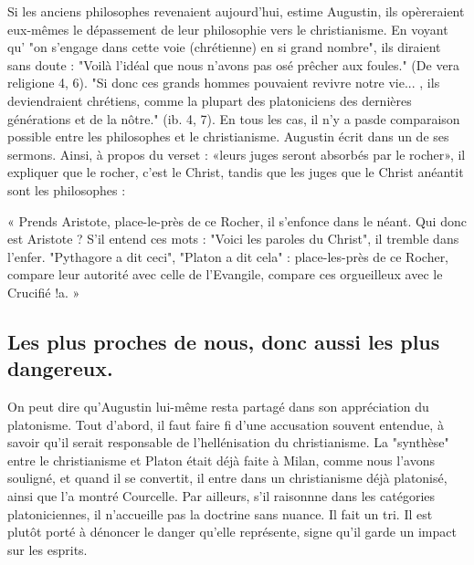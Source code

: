 Si les anciens philosophes revenaient aujourd'hui, estime Augustin, ils opèreraient eux-mêmes le dépassement de leur philosophie vers le christianisme. En voyant qu' "on s'engage dans cette voie (chrétienne) en si grand nombre", ils diraient sans doute : "Voilà l'idéal que nous n'avons pas osé prêcher aux foules." (De vera religione  4, 6). "Si donc ces grands hommes pouvaient revivre notre vie... , ils deviendraient chrétiens, comme la plupart des platoniciens des
dernières générations et  de la nôtre." (ib. 4, 7). En tous les cas, il n'y a pasde
comparaison possible entre les philosophes et le christianisme. Augustin écrit dans un de ses sermons. Ainsi, à propos du verset : «leurs juges seront absorbés par le rocher», il expliquer que le rocher, c'est le Christ, tandis que les juges que le Christ anéantit sont les philosophes :

« Prends Aristote, place-le-près de ce Rocher, il s'enfonce dans le néant. Qui donc est Aristote ? S'il entend ces mots : "Voici les paroles du Christ", il tremble dans l'enfer. "Pythagore a dit ceci", "Platon a dit cela" : place-les-près de ce Rocher, compare leur autorité avec celle de l'Evangile, compare ces orgueilleux avec le Crucifié !a. »

\subsection{Les plus proches de nous, donc aussi les plus dangereux.}
 

On peut dire qu'Augustin lui-même resta partagé dans son appréciation du platonisme. Tout d'abord, il faut faire fi d'une accusation souvent entendue, à savoir qu'il serait responsable de l'hellénisation du christianisme. La "synthèse" entre le christianisme et Platon était déjà faite à Milan, comme nous l'avons souligné, et quand il se convertit, il entre dans un christianisme déjà platonisé, ainsi que l'a montré Courcelle. Par ailleurs, s'il raisonnne dans les catégories platoniciennes, il n'accueille pas la doctrine sans nuance. Il fait un tri. Il est plutôt porté à dénoncer le danger qu'elle représente, signe qu'il garde un impact sur les esprits.

